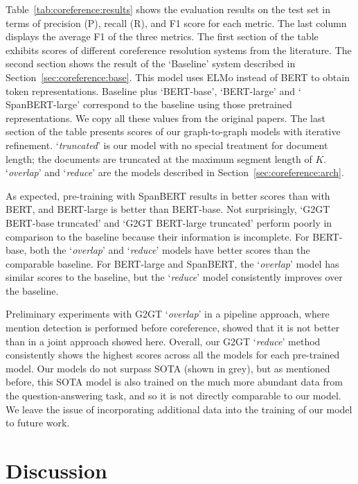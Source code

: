 \documentclass[11pt]{article}
\begin{document}
Table~\ref{tab:coreference:results} shows the evaluation results on the test set in terms of precision (P), recall (R), and F1 score for each metric. The last column displays the average F1 of the three metrics. The first section of the table exhibits scores of different coreference resolution systems from the literature.  The second section shows the result of the `Baseline' \cite{lee-etal-2018-higher} system described in Section~\ref{sec:coreference:base}. This model uses ELMo
\cite{peters-etal-2018-deep} instead of BERT to obtain token representations. Baseline plus `BERT-base', `BERT-large' \cite{joshi-etal-2019-bert} and ` SpanBERT-large' \cite{joshi-etal-2020-spanbert} correspond to the baseline using those pretrained representations. We copy all these values from the original papers. The last section of the table presents scores of our graph-to-graph  models with iterative refinement. `\emph{truncated}' is our model with no special treatment for document length; the documents are truncated at the maximum segment length of $K$. `\emph{overlap}' and `\emph{reduce}' are the models described in Section~\ref{sec:coreference:arch}.

As expected, pre-training with SpanBERT results in better scores than with BERT, and BERT-large is better than BERT-base.
Not surprisingly, `G2GT BERT-base truncated' and `G2GT BERT-large truncated' perform poorly in comparison to the baseline because their information is incomplete. For BERT-base, both the `\emph{overlap}' and `\emph{reduce}' models have better scores than the comparable baseline.  For BERT-large and SpanBERT, the `\emph{overlap}' model has similar scores to the baseline, but the `\emph{reduce}' model consistently improves over the baseline. 

Preliminary experiments with G2GT `\emph{overlap}' in a pipeline approach, where mention detection is performed before coreference, showed that it is not better than in a joint approach showed here. Overall, our G2GT `\emph{reduce}' method consistently shows the highest scores across all the models for each pre-trained model. 
Our models do not surpass SOTA \cite{wu-etal-2020-corefqa} (shown in grey), but as mentioned before, this SOTA model is also trained on the much more abundant data from the question-answering task, and so it is not directly comparable to our model. We leave the issue of incorporating additional data into the training of our model to future work.

\section{Discussion} 
\label{sec:coreference:discussion}
\end{document}
